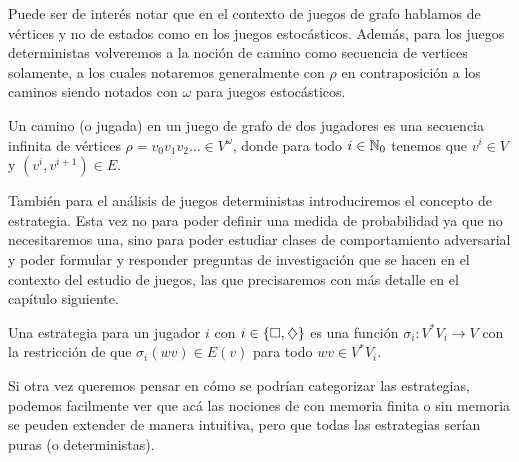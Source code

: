 Puede ser de interés notar que en el contexto de juegos de grafo hablamos de
vértices y no de estados como en los juegos estocásticos. Además, para los
juegos deterministas volveremos a la noción de camino como secuencia de
vertices solamente, a los cuales notaremos generalmente con $\rho$ en
contraposición a los caminos siendo notados con $\omega$ para juegos
estocásticos.

\begin{definition}
	Un camino (o jugada) en un juego de grafo de dos jugadores es una secuencia infinita de vértices $\rho = v_0v_1v_2 \dots \in V^\omega$, donde para todo $i \in \mathbb{N}_0$ tenemos que $v^i \in V$ y $(v^i, v^{i+1}) \in E$.

\end{definition}

También para el análisis de juegos deterministas introduciremos el concepto de
estrategia. Esta vez no para poder definir una medida de probabilidad ya que no
necesitaremos una, sino para poder estudiar clases de comportamiento
adversarial y poder formular y responder preguntas de investigación que se
hacen en el contexto del estudio de juegos, las que precisaremos con más
detalle en el capítulo siguiente.


\begin{definition}
	Una estrategia para un jugador $i$ con $i \in \{\square, \diamondsuit\}$ es una función $\sigma_i: V^*V_i \rightarrow V$ con la restricción de que $\sigma_i(wv) \in E(v)$ para todo $wv \in V^*V_i$.
\end{definition}

Si otra vez queremos pensar en cómo se podrían categorizar las estrategias,
podemos facilmente ver que acá las nociones de con memoria finita o sin memoria
se peuden extender de manera intuitiva, pero que todas las estrategias serían
puras (o deterministas).

